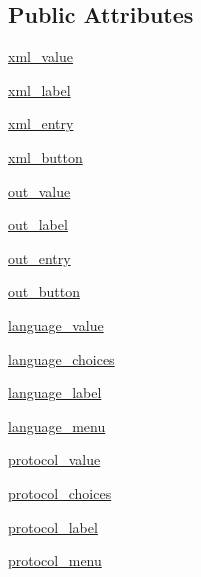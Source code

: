 \subsection*{Public Attributes}
\begin{DoxyCompactItemize}
\item 
\mbox{\hyperlink{classmavgenerate_1_1Application_a3ff48323bd54de5a059f8f1fc859d951}{xml\+\_\+value}}
\item 
\mbox{\hyperlink{classmavgenerate_1_1Application_ae45e4435e7c613cbdb6267d1d3dd89c7}{xml\+\_\+label}}
\item 
\mbox{\hyperlink{classmavgenerate_1_1Application_a4e3cbbca10c44eeba1001538a0d2e85a}{xml\+\_\+entry}}
\item 
\mbox{\hyperlink{classmavgenerate_1_1Application_a3e6486554e825b9ce3921ea1dde39379}{xml\+\_\+button}}
\item 
\mbox{\hyperlink{classmavgenerate_1_1Application_ac20e972531133d54c1ebc5d27db4dfcd}{out\+\_\+value}}
\item 
\mbox{\hyperlink{classmavgenerate_1_1Application_a5874e81804ec5a55e1c56a1bb2f59b0b}{out\+\_\+label}}
\item 
\mbox{\hyperlink{classmavgenerate_1_1Application_a2e2051c1e1e385bad3ccf23c8165e9bc}{out\+\_\+entry}}
\item 
\mbox{\hyperlink{classmavgenerate_1_1Application_ab450cfab9901d7b5be7f7b80aa510471}{out\+\_\+button}}
\item 
\mbox{\hyperlink{classmavgenerate_1_1Application_a9a4430b1b9217ebdb04faffa7e9af6cb}{language\+\_\+value}}
\item 
\mbox{\hyperlink{classmavgenerate_1_1Application_a7fc576442b8a076c35e2fcbf181f4c8a}{language\+\_\+choices}}
\item 
\mbox{\hyperlink{classmavgenerate_1_1Application_afc688be6fb7bcdb0f85568ca387cada3}{language\+\_\+label}}
\item 
\mbox{\hyperlink{classmavgenerate_1_1Application_aa1666917bbb914fe2714c9a79ece08cc}{language\+\_\+menu}}
\item 
\mbox{\hyperlink{classmavgenerate_1_1Application_ac7e2e3fc39aec353cd15e63ff0f76796}{protocol\+\_\+value}}
\item 
\mbox{\hyperlink{classmavgenerate_1_1Application_a9ff45786bc967e1ddf61447e62405749}{protocol\+\_\+choices}}
\item 
\mbox{\hyperlink{classmavgenerate_1_1Application_a83f55652f56719cbc5e84e8dbb746911}{protocol\+\_\+label}}
\item 
\mbox{\hyperlink{classmavgenerate_1_1Application_ab005c01e04b1c06d96ea7fe16b1685aa}{protocol\+\_\+menu}}

\end{DoxyCompactItemize}

